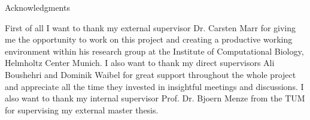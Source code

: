 \thispagestyle{empty}


{ Acknowledgments}

\vspace{10mm}

First of all I want to thank my external supervisor Dr. Carsten Marr for giving me the opportunity to work on this project and creating a productive working environment within his research group at the Institute of Computational Biology, Helmholtz Center Munich. I also want to thank my direct supervisors Ali Boushehri and Dominik Waibel for great support throughout the whole project and appreciate all the time they invested in insightful meetings and discussions. I also want to thank my internal supervisor Prof. Dr. Bjoern Menze from the TUM for supervising my external master thesis.

\cleardoublepage{}
